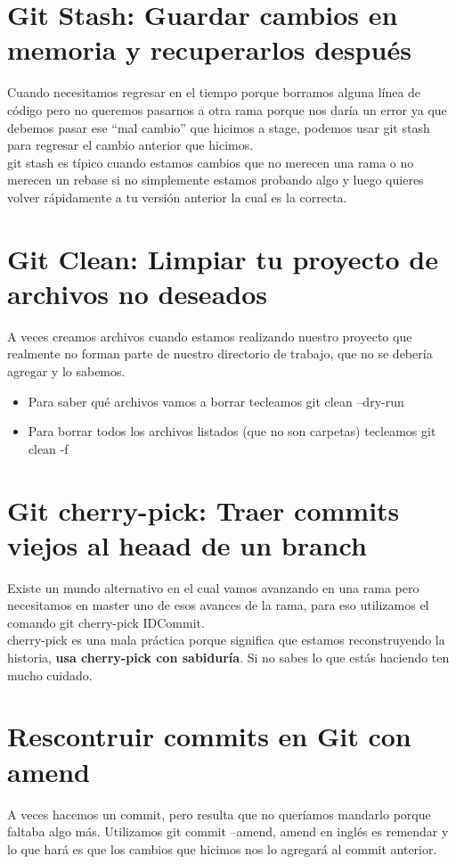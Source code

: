\documentclass{article}
\begin{document}
\section{Git Stash: Guardar cambios en memoria y recuperarlos después}%
Cuando necesitamos regresar en el tiempo porque borramos alguna línea de código
pero no queremos pasarnos a otra rama porque nos daría un error ya que debemos
pasar ese “mal cambio” que hicimos a stage, podemos usar git stash para
regresar el cambio anterior que hicimos.\\

git stash es típico cuando estamos cambios que no merecen una rama o no merecen
un rebase si no simplemente estamos probando algo y luego quieres volver
rápidamente a tu versión anterior la cual es la correcta.

\section{Git Clean: Limpiar tu proyecto de archivos no deseados}%
A veces creamos archivos cuando estamos realizando nuestro proyecto que
realmente no forman parte de nuestro directorio de trabajo, que no se debería
agregar y lo sabemos.\\

\begin{itemize}
  \item Para saber qué archivos vamos a borrar tecleamos git clean --dry-run
  \item Para borrar todos los archivos listados (que no son carpetas) tecleamos
    git clean -f
\end{itemize}

\section{Git cherry-pick: Traer commits viejos al heaad de un branch}%
Existe un mundo alternativo en el cual vamos avanzando en una rama pero
necesitamos en master uno de esos avances de la rama, para eso utilizamos el
comando git cherry-pick IDCommit.\\

cherry-pick es una mala práctica porque significa que estamos reconstruyendo la
historia, \textbf{usa cherry-pick con sabiduría}. Si no sabes lo que estás
haciendo ten mucho cuidado.


\section{Rescontruir commits en Git con amend}%
A veces hacemos un commit, pero resulta que no queríamos mandarlo porque
faltaba algo más. Utilizamos git commit --amend, amend en inglés es remendar y
lo que hará es que los cambios que hicimos nos lo agregará al commit
anterior.\\
\end{document}
